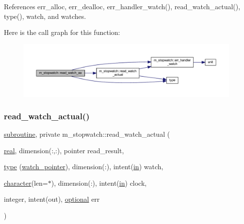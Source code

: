 References err\+\_\+alloc, err\+\_\+dealloc, err\+\_\+handler\+\_\+watch(), read\+\_\+watch\+\_\+actual(), type(), watch, and watches.

Here is the call graph for this function\+:
\nopagebreak
\begin{figure}[H]
\begin{center}
\leavevmode
\includegraphics[width=350pt]{namespacem__stopwatch_a528d4073fce87b4e438a9cfbe0f12549_cgraph}
\end{center}
\end{figure}
\mbox{\label{namespacem__stopwatch_a5cac73ed1e81ddd74796a45b37b31ec4}} 
\subsubsection{\texorpdfstring{read\+\_\+watch\+\_\+actual()}{read\_watch\_actual()}}
{\footnotesize\ttfamily \hyperlink{M__stopwatch_83_8txt_acfbcff50169d691ff02d4a123ed70482}{subroutine}, private m\+\_\+stopwatch\+::read\+\_\+watch\+\_\+actual (\begin{DoxyParamCaption}\item[{\hyperlink{read__watch_83_8txt_abdb62bde002f38ef75f810d3a905a823}{real}, dimension(\+:,\+:), pointer}]{read\+\_\+result,  }\item[{\hyperlink{stop__watch_83_8txt_a70f0ead91c32e25323c03265aa302c1c}{type} (\hyperlink{structm__stopwatch_1_1watch__pointer}{watch\+\_\+pointer}), dimension(\+:), intent(\hyperlink{M__journal_83_8txt_afce72651d1eed785a2132bee863b2f38}{in})}]{watch,  }\item[{\hyperlink{option__stopwatch_83_8txt_abd4b21fbbd175834027b5224bfe97e66}{character}(len=$\ast$), dimension(\+:), intent(\hyperlink{M__journal_83_8txt_afce72651d1eed785a2132bee863b2f38}{in})}]{clock,  }\item[{integer, intent(out), \hyperlink{option__stopwatch_83_8txt_aa4ece75e7acf58a4843f70fe18c3ade5}{optional}}]{err }\end{DoxyParamCaption})\hspace{0.3cm}{\ttfamily [private]}}



